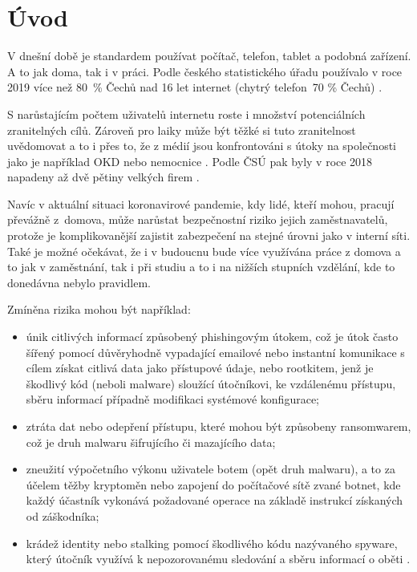 \section{Úvod}
\label{sec:Introduction}

V dnešní době je standardem používat počítač, telefon, tablet a podobná zařízení. A to jak doma, tak i v práci. Podle českého statistického úřadu používalo v roce 2019 více než 80~\% Čechů nad 16 let internet (chytrý telefon~70 \% Čechů) \cite{csu_internet_cesi}. 

S narůstajícím počtem uživatelů internetu roste i množství potenciálních zranitelných cílů. Zároveň pro laiky může být těžké si tuto zranitelnost uvědomovat a to i přes to, že z médií jsou konfrontováni s útoky na společnosti jako je například OKD \cite{okd_hacknuto} nebo nemocnice \cite{nemocnice_hacknuto}. Podle ČSÚ pak byly v roce 2018 napadeny až dvě pětiny velkých firem \cite{csu_hacknuto_podniky}.

Navíc v aktuální situaci koronavirové pandemie, kdy lidé, kteří mohou, pracují převážně z~domova, může narůstat bezpečnostní riziko jejich zaměstnavatelů, protože je komplikovanější zajistit zabezpečení na stejné úrovni jako v interní síti. Také je možné očekávat, že i v budoucnu bude více využívána práce z domova a to jak v zaměstnání, tak i při studiu a to i na nižších stupních vzdělání, kde to donedávna nebylo pravidlem.

Zmíněna rizika mohou být například: %

\begin{itemize}
    \item únik citlivých informací způsobený phishingovým útokem, což je útok často šířený pomocí důvěryhodně vypadající emailové nebo instantní komunikace s cílem získat citlivá data jako přístupové údaje, nebo rootkitem, jenž je škodlivý kód (neboli malware) sloužící útočníkovi, ke vzdálenému přístupu, sběru informací případně modifikaci systémové konfigurace;
    
    \item ztráta dat nebo odepření přístupu, které mohou být způsobeny ransomwarem, což je druh malwaru šifrujícího či mazajícího data;
    
    \item zneužití výpočetního výkonu uživatele botem (opět druh malwaru), a to za účelem těžby kryptoměn nebo zapojení do počítačové sítě zvané botnet, kde každý účastník vykonává požadované operace na základě instrukcí získaných od záškodníka; %
    
    \item krádež identity nebo stalking pomocí škodlivého kódu nazývaného spyware, který útočník využívá k nepozorovanému sledování a sběru informací o oběti \cite{cyberrisks}.
\end{itemize}

